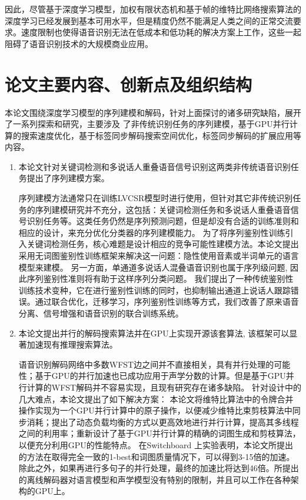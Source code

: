 因此，尽管基于深度学习模型，加权有限状态机和基于帧的维特比网络搜索算法的深度学习已经发展到基本可用水平，但是精度仍然不能满足人类之间的正常交流要求。速度限制也使得语音识别无法在低成本和低功耗的解决方案上工作，这些一起阻碍了语音识别技术的大规模商业应用。


\section{论文主要内容、创新点及组织结构}
\label{chap:intro0-thesis}


本论文围绕深度学习模型的序列建模和解码，针对上面探讨的诸多研究缺陷，展开了一系列探索和研究，主要涉及
了非传统识别任务的序列建模，基于GPU并行计算的搜索速度优化，基于标签同步解码搜索空间优化，标签同步解码的扩展应用等内容。

\begin{enumerate}
\item 本论文针对关键词检测和多说话人重叠语音信号识别这两类非传统语音识别任务提出了序列建模方案。

序列建模方法通常只在训练LVCSR模型时进行使用，但针对其它非传统识别任务的序列建模研究并不充分，这包括：关键词检测任务和多说话人重叠语音信号识别任务等。这类任务仍然是序列预测问题，但是却没有合适的训练准则和相应的设计，来充分优化分类器的序列建模能力。
为了将序列鉴别性训练引入关键词检测任务，核心难题是设计相应的竞争可能性建模方法。本论文提出采用无词图鉴别性训练框架来解决这一问题：隐性使用音素或半词单元的语言模型来建模。
另一方面，单通道多说话人混叠语音识别也属于序列级问题, 因此序列鉴别性准则将有助于这样序列分类问题。
我们提出了一种传统鉴别性训练技术变种，它在进行鉴别性训练的同时，也抑制输出通道上说话人跟踪错误。通过联合优化，迁移学习，序列鉴别性训练等方式，我们改善了原来语音分离、信号增强和语音识别的联合训练系统。

    \item 
本论文提出并行的解码搜索算法并在GPU上实现开源该套算法, 该框架可以显著加速现有推理搜索算法。

语音识别解码网络中多数WFST边之间并不直接相关，具有并行处理的可能性；基于GPU的并行加速也已成功应用于声学分数的计算。但是基于GPU并行计算的WFST解码并不容易实现，且现有研究存在诸多缺陷。
针对设计中的几大难点，本论文提出了如下解决方案：
本论文将维特比算法中的令牌合并操作实现为一个GPU并行计算中的原子操作，以便减少维特比束剪枝算法中同步消耗；提出了动态负载均衡的方式以更高效地进行并行计算，提高其多线程之间的利用率；重新设计了基于GPU并行计算的精确的词图生成和剪枝算法，以便充分利用GPU的性能特点。
%
在Switchboard 上实验表明，本论文所提出的方法在取得完全一致的1-best和词图质量情况下，可以得到3-15倍的加速。除此之外，如果再进行多句子的并行处理，最终的加速比将达到46倍。所提出的离线解码器对语言模型和声学模型没有特别的限制，并且可以工作在各种架构的GPU上。



\end{enumerate}
